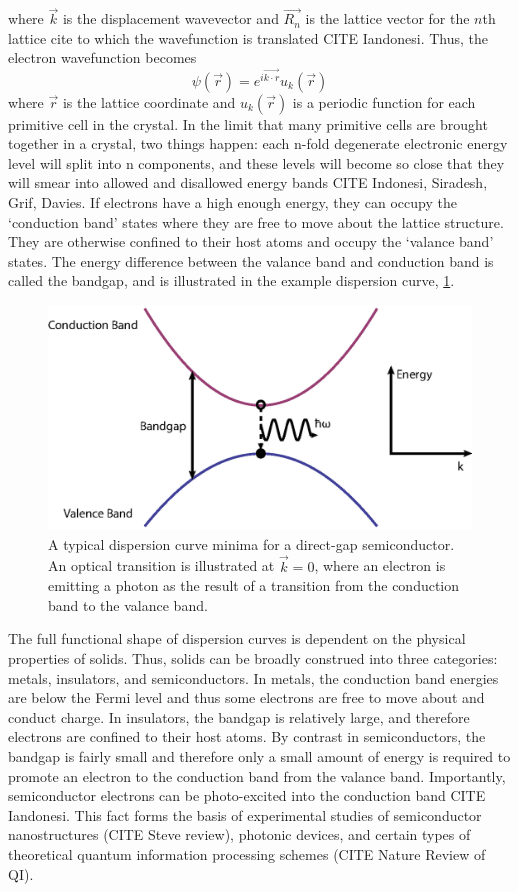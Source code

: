where $\vec{k}$ is the displacement wavevector and  $\vec{R_n}$ is the lattice vector for the $n$th lattice cite to which the wavefunction is translated CITE Iandonesi. Thus, the electron wavefunction becomes 
 \begin{equation}
 \psi(\vec{r}) = e^{i \vec{k\cdot r}} u_k(\vec{r})
 \end{equation}
where $\vec{r}$ is the lattice coordinate and $u_k(\vec{r})$ is a periodic function for each primitive cell in the crystal. In the limit that many primitive cells are brought together in a crystal, two things happen: each n-fold degenerate electronic energy level will split into n components, and these levels will become so close that they will smear into allowed and disallowed energy bands CITE Indonesi, Siradesh, Grif, Davies. If electrons have a high enough energy, they can occupy the `conduction band' states where they are free to move about the lattice structure. They are otherwise confined to their host atoms and occupy the `valance band' states. The energy difference between the valance band and conduction band is called the bandgap, and is illustrated in the example dispersion curve, \ref{Example band structure of a direct-gap semiconductor.}. 

\begin{figure}[h!]
\centering
\includegraphics[width = .7\textwidth]{dispcurve.eps}
\caption{A typical dispersion curve minima for a direct-gap semiconductor. An optical transition is illustrated at $\vec{k} = 0$, where an electron is emitting a photon as the result of a transition from the conduction band to the valance band.}
\label{Example band structure of a direct-gap semiconductor.}
\end{figure}

\indent The full functional shape of dispersion curves is dependent on the physical properties of solids. Thus, solids can be broadly construed into three categories: metals, insulators, and semiconductors. In metals, the conduction band energies are below the Fermi level and thus some electrons are free to move about and conduct charge. In insulators, the bandgap is relatively large, and therefore electrons are confined to their host atoms. By contrast in semiconductors, the bandgap is fairly small and therefore only a small amount of energy is required to promote an electron to the conduction band from the valance band. Importantly, semiconductor electrons can be photo-excited into the conduction band CITE Iandonesi. This fact forms the basis of experimental studies of semiconductor nanostructures (CITE Steve review), photonic devices, and certain types of theoretical quantum information processing schemes (CITE Nature Review of QI).

